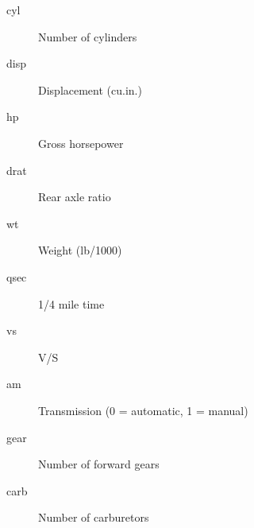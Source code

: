 \documentclass[a4paper,12pt]{article}
\begin{document}
\begin{description}
	\item[cyl]  Number of cylinders
	\item[disp]	 Displacement (cu.in.)
	\item[hp]  Gross horsepower
	\item[drat]	 Rear axle ratio
	\item[wt] Weight (lb/1000)
	\item[qsec]	 1/4 mile time
	\item[vs] V/S
	\item[am] Transmission (0 = automatic, 1 = manual)
	\item[gear]	 Number of forward gears
	\item[carb]	  Number of carburetors
\end{description}
\end{document}
